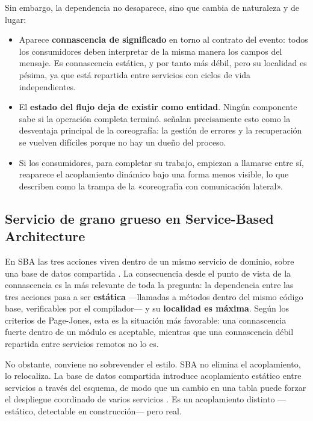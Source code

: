 Sin embargo, la dependencia no desaparece, sino que cambia de naturaleza y de lugar:

\begin{itemize}[leftmargin=1.5em]
  \item Aparece \textbf{connascencia de significado} en torno al contrato del evento: todos los consumidores deben interpretar de la misma manera los campos del mensaje. Es connascencia estática, y por tanto más débil, pero su localidad es pésima, ya que está repartida entre servicios con ciclos de vida independientes.
  \item El \textbf{estado del flujo deja de existir como entidad}. Ningún componente sabe si la operación completa terminó. \textcite{richardsford2020} señalan precisamente esto como la desventaja principal de la coreografía: la gestión de errores y la recuperación se vuelven difíciles porque no hay un dueño del proceso.
  \item Si los consumidores, para completar su trabajo, empiezan a llamarse entre sí, reaparece el acoplamiento dinámico bajo una forma menos visible, lo que \textcite{fordhardparts2021} describen como la trampa de la «coreografía con comunicación lateral».
\end{itemize}

\subsection{Servicio de grano grueso en Service-Based Architecture}

En SBA las tres acciones viven dentro de un mismo servicio de dominio, sobre una base de datos compartida \parencite{richardsford2020}. La consecuencia desde el punto de vista de la connascencia es la más relevante de toda la pregunta: la dependencia entre las tres acciones pasa a ser \textbf{estática} ---llamadas a métodos dentro del mismo código base, verificables por el compilador--- y su \textbf{localidad es máxima}. Según los criterios de Page-Jones, esta es la situación más favorable: una connascencia fuerte dentro de un módulo es aceptable, mientras que una connascencia débil repartida entre servicios remotos no lo es.

No obstante, conviene no sobrevender el estilo. SBA no elimina el acoplamiento, lo relocaliza. La base de datos compartida introduce acoplamiento estático entre servicios a través del esquema, de modo que un cambio en una tabla puede forzar el despliegue coordinado de varios servicios \parencite{richardsford2020}. Es un acoplamiento distinto ---estático, detectable en construcción--- pero real.

